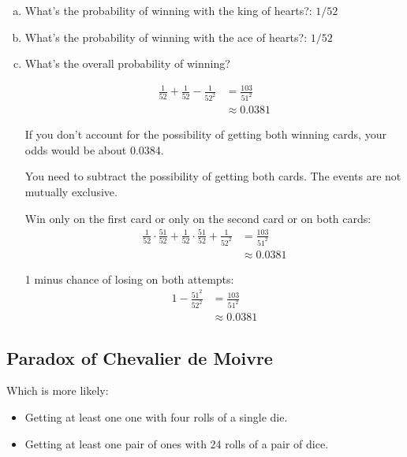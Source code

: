 \documentclass[letterpaper, landscape]{exam}
\begin{document}
  
  \begin{enumerate}[(a)]
    \item What's the probability of winning with the king of hearts?: $1/52$
    \item What's the probability of winning with the ace of hearts?: $1/52$

    \item What's the overall probability of winning? 
    
    \begin{solution}
      \begin{align*}
        \frac{1}{52} + \frac{1}{52} - \frac{1}{52^2} & = \frac{103}{51^2} \\
                                                     & \approx 0.0381
      \end{align*}
      
      If you don't account for the possibility of getting both winning cards,
      your odds would be about 0.0384.
      
      You need to subtract the possibility of getting both cards. The events are
      not mutually exclusive.

      Win only on the first card or only on the second card or on both cards:
      \begin{align*}
        \frac{1}{52} \cdot \frac{51}{52} + \frac{1}{52} \cdot \frac{51}{52} 
            + \frac{1}{52^2} & = \frac{103}{51^2} \\
                             & \approx 0.0381
      \end{align*}

      1 minus chance of losing on both attempts:
      \begin{align*}
            1 - \frac{51^2}{52^2} & = \frac{103}{51^2} \\
                                  & \approx 0.0381
      \end{align*}

    \end{solution}
  \end{enumerate}

  \subsection{Paradox of Chevalier de Moivre}

  Which is more likely:
  \begin{itemize}
    \item Getting at least one one with four rolls of a single die.
    \item Getting at least one pair of ones with 24 rolls of a pair of dice.
  \end{itemize}
\end{document}
